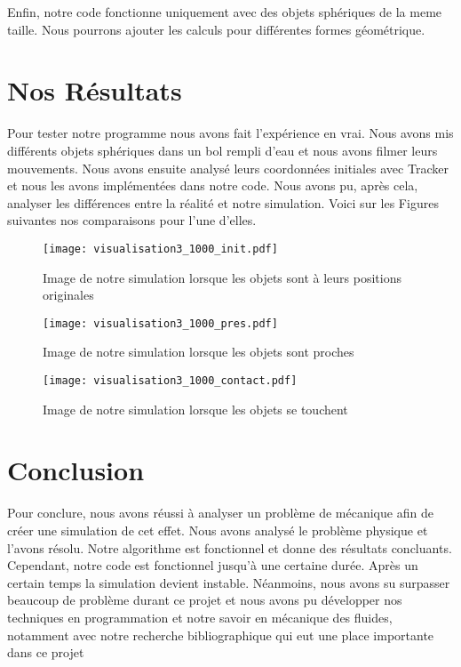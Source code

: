         Enfin, notre code fonctionne uniquement avec des objets sphériques de la meme taille. Nous pourrons ajouter les calculs pour différentes formes géométrique.  
\section{Nos Résultats}
    Pour tester notre programme nous avons fait l'expérience en vrai. Nous avons mis différents objets sphériques dans un bol rempli d'eau et nous avons filmer leurs mouvements. Nous avons ensuite analysé leurs coordonnées initiales avec Tracker et nous les avons implémentées dans notre code. Nous avons pu, après cela, analyser les différences entre la réalité et notre simulation. Voici sur les Figures suivantes nos comparaisons pour l'une d'elles.

    \begin{figure}[H]
        \centering
        \texttt{[image: visualisation3\_1000\_init.pdf]}
        \caption{Image de notre simulation lorsque les objets sont à leurs positions originales}
        \label{fig:simul_init}
    \end{figure}
    \begin{figure}[H]
        \centering
        \texttt{[image: visualisation3\_1000\_pres.pdf]}
        \caption{Image de notre simulation lorsque les objets sont proches}
        \label{fig:simul_pres}
    \end{figure}
    \begin{figure}[H]
        \centering
        \texttt{[image: visualisation3\_1000\_contact.pdf]}
        \caption{Image de notre simulation lorsque les objets se touchent}
        \label{fig:simul_contact}
    \end{figure}
    
    
\section*{Conclusion}
    Pour conclure, nous avons réussi à analyser un problème de mécanique afin de créer une simulation de cet effet. Nous avons analysé le problème physique et l'avons résolu. Notre algorithme est fonctionnel et donne des résultats concluants. Cependant, notre code est fonctionnel jusqu'à une certaine durée. Après un certain temps la simulation devient instable. Néanmoins, nous avons su surpasser beaucoup de problème durant ce projet et nous avons pu développer nos techniques en programmation et notre savoir en mécanique des fluides, notamment avec notre recherche bibliographique qui eut une place importante dans ce projet 
